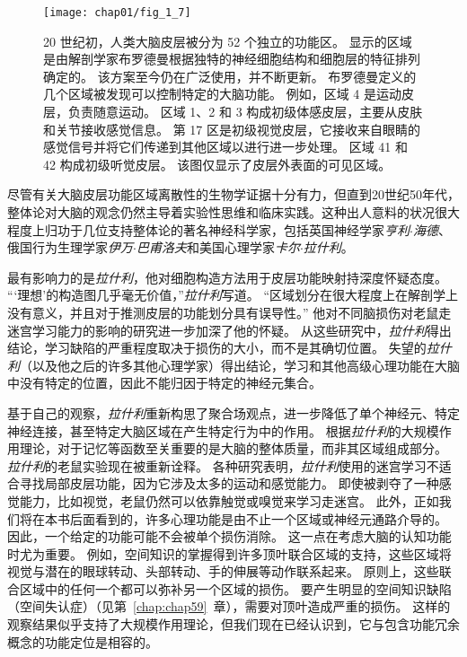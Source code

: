 \begin{figure}[htbp]
	\centering
	\texttt{[image: chap01/fig\_1\_7]}
	\caption{20 世纪初，人类大脑皮层被分为 52 个独立的功能区。
		显示的区域是由解剖学家布罗德曼根据独特的神经细胞结构和细胞层的特征排列确定的。
		该方案至今仍在广泛使用，并不断更新。
		布罗德曼定义的几个区域被发现可以控制特定的大脑功能。
		例如，区域 4 是运动皮层，负责随意运动。
		区域 1、2 和 3 构成初级体感皮层，主要从皮肤和关节接收感觉信息。
		第 17 区是初级视觉皮层，它接收来自眼睛的感觉信号并将它们传递到其他区域以进行进一步处理。
		区域 41 和 42 构成初级听觉皮层。
		该图仅显示了皮层外表面的可见区域。}
	\label{fig:1_7}
\end{figure}

尽管有关大脑皮层功能区域离散性的生物学证据十分有力，但直到20世纪50年代，整体论对大脑的观念仍然主导着实验性思维和临床实践。这种出人意料的状况很大程度上归功于几位支持整体论的著名神经科学家，包括英国神经学家\textit{亨利$\cdot$海德}、俄国行为生理学家\textit{伊万$\cdot$巴甫洛夫}和美国心理学家\textit{卡尔$\cdot$拉什利}。



最有影响力的是\textit{拉什利}，他对细胞构造方法用于皮层功能映射持深度怀疑态度。
“‘理想’的构造图几乎毫无价值，”\textit{拉什利}写道。
“区域划分在很大程度上在解剖学上没有意义，并且对于推测皮层的功能划分具有误导性。” 
他对不同脑损伤对老鼠走迷宫学习能力的影响的研究进一步加深了他的怀疑。
从这些研究中，\textit{拉什利}得出结论，学习缺陷的严重程度取决于损伤的大小，而不是其确切位置。
失望的\textit{拉什利}（以及他之后的许多其他心理学家）得出结论，学习和其他高级心理功能在大脑中没有特定的位置，因此不能归因于特定的神经元集合。




基于自己的观察，\textit{拉什利}重新构思了聚合场观点，进一步降低了单个神经元、特定神经连接，甚至特定大脑区域在产生特定行为中的作用。
根据\textit{拉什利}的大规模作用理论，对于记忆等函数至关重要的是大脑的整体质量，而非其区域组成部分。
\textit{拉什利}的老鼠实验现在被重新诠释。
各种研究表明，\textit{拉什利}使用的迷宫学习不适合寻找局部皮层功能，因为它涉及太多的运动和感觉能力。
即使被剥夺了一种感觉能力，比如视觉，老鼠仍然可以依靠触觉或嗅觉来学习走迷宫。
此外，正如我们将在本书后面看到的，许多心理功能是由不止一个区域或神经元通路介导的。
因此，一个给定的功能可能不会被单个损伤消除。
这一点在考虑大脑的认知功能时尤为重要。
例如，空间知识的掌握得到许多顶叶联合区域的支持，这些区域将视觉与潜在的眼球转动、头部转动、手的伸展等动作联系起来。
原则上，这些联合区域中的任何一个都可以弥补另一个区域的损伤。
要产生明显的空间知识缺陷（空间失认症）（见第~\ref{chap:chap59}~章），需要对顶叶造成严重的损伤。
这样的观察结果似乎支持了大规模作用理论，但我们现在已经认识到，它与包含功能冗余概念的功能定位是相容的。


